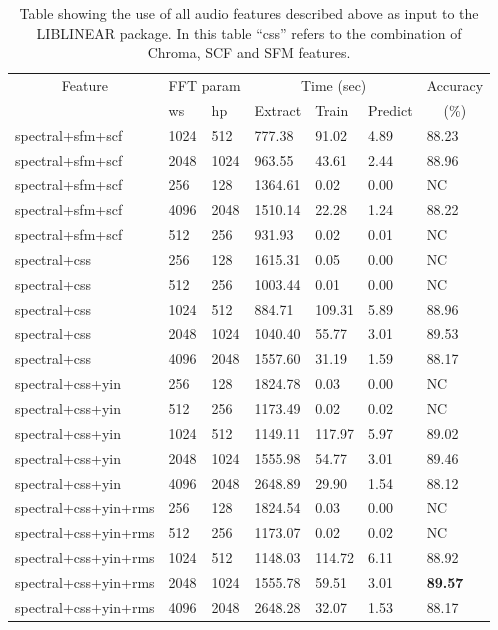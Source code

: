 \documentclass[12pt,oneside]{book}
\begin{document}
\begin{table}
\begin{tabular}{|l|l|l|l|l|l|l|}
\hline
\multicolumn{1}{|c|}{Feature} &\multicolumn{2}{c|}{FFT param} & \multicolumn{3}{c|}{Time (sec)} & Accuracy \\
\hhline{|~|-|-|-|-|-|~|}
\multicolumn{1}{|c|}{Extractor} & ws & hp & Extract & Train & Predict & \multicolumn{1}{c|}{(\%)} \\
\hhline{|=|=|=|=|=|=|=|}
spectral+sfm+scf & 1024 & 512        &   777.38  &   91.02  &   4.89  &  88.23  \\
spectral+sfm+scf & 2048 & 1024       &   963.55  &   43.61  &   2.44  &  88.96  \\
spectral+sfm+scf & 256 & 128         &  1364.61  &    0.02  &   0.00  &  NC  \\
spectral+sfm+scf & 4096 & 2048       &  1510.14  &   22.28  &   1.24  &  88.22  \\
spectral+sfm+scf & 512 & 256         &   931.93  &    0.02  &   0.01  &  NC  \\

spectral+css & 256 & 128             &  1615.31  &    0.05  &   0.00  &  NC  \\
spectral+css & 512 & 256             &  1003.44  &    0.01  &   0.00  &  NC  \\
spectral+css & 1024 & 512            &   884.71  &  109.31  &   5.89  &  88.96  \\
spectral+css & 2048 & 1024           &  1040.40  &   55.77  &   3.01  &  89.53  \\
spectral+css & 4096 & 2048           &  1557.60  &   31.19  &   1.59  &  88.17  \\
\hline
spectral+css+yin & 256 & 128         &  1824.78  &    0.03  &   0.00  &  NC  \\
spectral+css+yin & 512 & 256         &  1173.49  &    0.02  &   0.02  &  NC  \\
spectral+css+yin & 1024 & 512        &  1149.11  &  117.97  &   5.97  &  89.02  \\
spectral+css+yin & 2048 & 1024       &  1555.98  &   54.77  &   3.01  &  89.46  \\
spectral+css+yin & 4096 & 2048       &  2648.89  &   29.90  &   1.54  &  88.12  \\

spectral+css+yin+rms & 256 & 128     &  1824.54  &    0.03  &   0.00  &  NC  \\
spectral+css+yin+rms & 512 & 256     &  1173.07  &    0.02  &   0.02  &  NC  \\
spectral+css+yin+rms & 1024 & 512    &  1148.03  &  114.72  &   6.11  &  88.92  \\
spectral+css+yin+rms & 2048 & 1024   &  1555.78  &   59.51  &   3.01  &  \textbf{89.57}  \\
spectral+css+yin+rms & 4096 & 2048   &  2648.28  &   32.07  &   1.53  &  88.17  \\
\hline
\end{tabular}
\caption{Table showing the use of all audio features described above
  as input to the LIBLINEAR package.  In this table ``css'' refers to
  the combination of Chroma, SCF and SFM features. }
\label{table:obv-different-all}
\end{table}
\end{document}
